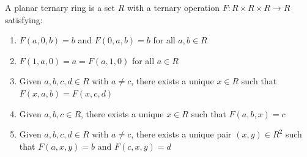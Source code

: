 A planar ternary ring is a set $R$ with a ternary operation $F: R \times R \times R \to R$ satisfying:
\begin{enumerate}
\item $F(a, 0, b) = b$ and $F(0, a, b) = b$ for all $a, b \in R$
\item $F(1, a, 0) = a = F(a, 1, 0)$ for all $a \in R$
\item Given $a, b, c, d \in R$ with $a \neq c$, there exists a unique $x \in R$ such that $F(x, a, b) = F(x, c, d)$
\item Given $a, b, c \in R$, there exists a unique $x \in R$ such that $F(a, b, x) = c$
\item Given $a, b, c, d \in R$ with $a \neq c$, there exists a unique pair $(x, y) \in R^2$ such that $F(a, x, y) = b$ and $F(c, x, y) = d$
\end{enumerate}
